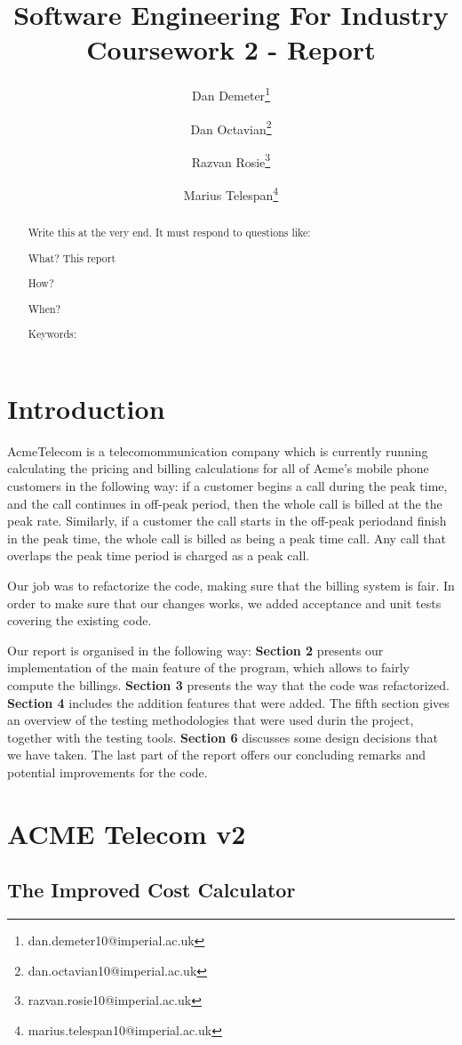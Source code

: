 \documentclass[11pt,twocolumn]{article} %
\title{Software Engineering For Industry \\ Coursework 2 - Report}
\author[1]{Dan Demeter\thanks{dan.demeter10@imperial.ac.uk}}
\author[1]{Dan Octavian\thanks{dan.octavian10@imperial.ac.uk}}
\author[1]{Razvan Rosie\thanks{razvan.rosie10@imperial.ac.uk}}
\author[1]{Marius Telespan\thanks{marius.telespan10@imperial.ac.uk}}
\affil[1]{Department of Computing, Imperial College London}
\begin{document}
\maketitle

\begin{abstract}
Write this at the very end. It must respond to questions like:

What? This report 

How?

When?


Keywords:
\end{abstract}


\section{Introduction}
AcmeTelecom is a telecomommunication company which is currently running calculating the pricing and billing calculations
for all of Acme's mobile phone customers in the following way: if a customer begins a call during the peak time, and the call 
continues in off-peak period, then the whole call is billed at the the peak rate. Similarly, if a customer the call starts in 
the off-peak periodand finish in the peak time, the whole call is billed as being a peak time call. Any call that overlaps the 
peak time period is charged as a peak call.


Our job was to refactorize the code, making sure that the billing system is fair. In order to make sure that our changes works,
we added acceptance and unit tests covering the existing code.

Our report is organised in the following way: {\bf Section 2} presents our implementation of the main feature of the program, which
allows to fairly compute the billings. {\bf Section 3} presents the way that the code was refactorized. 
{\bf Section 4} includes the addition features that were added. 
The fifth section gives an overview of the testing methodologies that were used durin the project, together with the testing tools.
{\bf Section 6} discusses some design decisions that we have taken.
The last part of the report offers our concluding remarks and potential improvements for the code.

\section{ACME Telecom v2}

\subsection{The Improved Cost Calculator}
\end{document}
